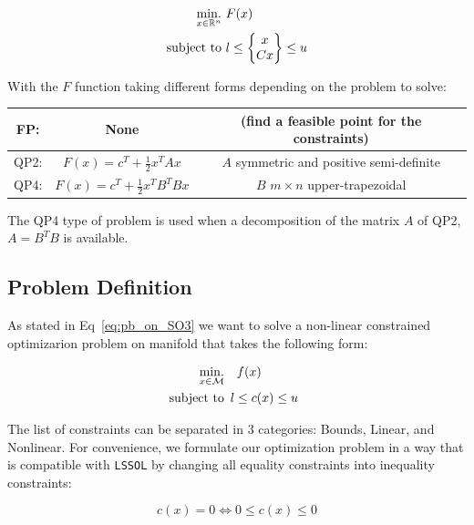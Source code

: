 \begin{align}
  \operatorname*{min.}_{x\in \mathbb{R}^n}\ &{F(x)}\\
  \text{subject to}\  & l\leq \begin{Bmatrix}
    x\\
    Cx
  \end{Bmatrix}
  \leq u
\end{align}

With the $F$ function taking different forms depending on the problem to solve:
\begin{table} [H]
\centering
\begin{tabular}{ccc}
  \toprule
  FP:\@ & None & (find a feasible point for the constraints)\\
  \midrule
  QP2: & $F(x)=c^T+\frac{1}{2} x^T A x$ & $A$ symmetric and positive semi-definite \\
  \midrule
  QP4: & $F(x)=c^T+\frac{1}{2} x^T B^T B x$ & $B$ $m\times n$ upper-trapezoidal \\
  \bottomrule
\end{tabular}
\end{table}

The QP4 type of problem is used when a decomposition of the matrix $A$ of QP2, $A=B^T B$ is available.

\subsection{Problem Definition}
\label{sub:problem_definition}

As stated in Eq~\ref{eq:pb_on_SO3} we want to solve a non-linear constrained optimizarion problem on manifold that takes the following form:

\begin{align}
  \operatorname*{min.}_{x \in \mathcal{M}} & \quad f(x)\\
  \text{subject to}&
  \begin{array}{lr}
    l \leq c(x) \leq u \nonumber
  \end{array}
\end{align}

The list of constraints can be separated in 3 categories: Bounds, Linear, and Nonlinear.
For convenience, we formulate our optimization problem in a way that is compatible with {\tt LSSOL} by changing all equality constraints into inequality constraints:

\begin{equation}
  c(x) = 0 \Leftrightarrow 0 \leq c(x) \leq 0
\end{equation}


